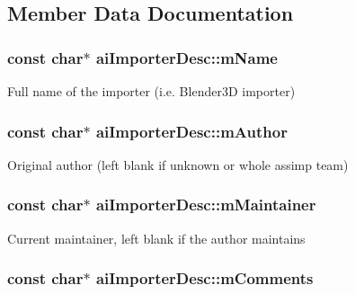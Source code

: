 \subsection{Member Data Documentation}
\hypertarget{structai_importer_desc_2a9d5fd818c01bba1a0a782722ab9495}{
\subsubsection[mName]{\setlength{\rightskip}{0pt plus 5cm}const char$\ast$ {\bf aiImporterDesc::mName}}}
\label{structai_importer_desc_2a9d5fd818c01bba1a0a782722ab9495}


Full name of the importer (i.e. Blender3D importer) \hypertarget{structai_importer_desc_8e050453324b1e855701c7c082c1b24b}{
\subsubsection[mAuthor]{\setlength{\rightskip}{0pt plus 5cm}const char$\ast$ {\bf aiImporterDesc::mAuthor}}}
\label{structai_importer_desc_8e050453324b1e855701c7c082c1b24b}


Original author (left blank if unknown or whole assimp team) \hypertarget{structai_importer_desc_53bf0ecb36ce0b97018b4b6bd2748f02}{
\subsubsection[mMaintainer]{\setlength{\rightskip}{0pt plus 5cm}const char$\ast$ {\bf aiImporterDesc::mMaintainer}}}
\label{structai_importer_desc_53bf0ecb36ce0b97018b4b6bd2748f02}


Current maintainer, left blank if the author maintains \hypertarget{structai_importer_desc_2d8ad562f6c18ee9e8bfdb2da4871118}{
\subsubsection[mComments]{\setlength{\rightskip}{0pt plus 5cm}const char$\ast$ {\bf aiImporterDesc::mComments}}}
\label{structai_importer_desc_2d8ad562f6c18ee9e8bfdb2da4871118}


